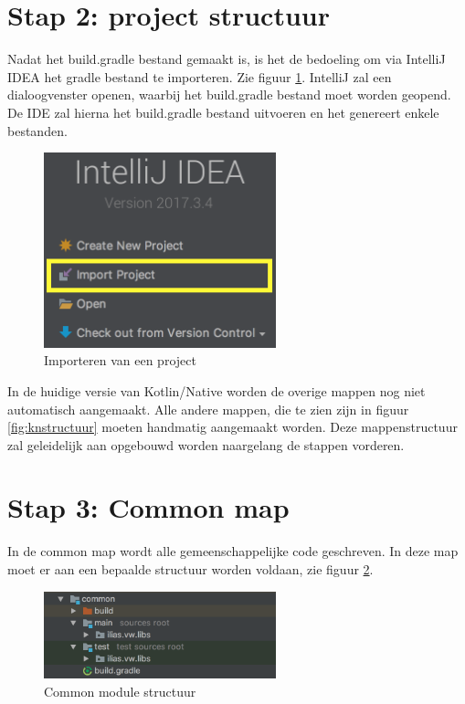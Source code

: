 \section{Stap 2: project structuur}
Nadat het build.gradle bestand gemaakt is, is het de bedoeling om via IntelliJ IDEA het gradle bestand te importeren. Zie figuur \ref{fig:stap2-import}. IntelliJ zal een dialoogvenster openen, waarbij het build.gradle bestand moet worden geopend. De IDE zal hierna het build.gradle bestand uitvoeren en het genereert enkele bestanden.

\begin{figure} [ht]
	\centering
	\includegraphics[width=0.60\textwidth]{img/stap2-import.png}
	\caption{Importeren van een project}
	\label{fig:stap2-import}
\end{figure}

In de huidige versie van Kotlin/Native worden de overige mappen nog niet automatisch aangemaakt. Alle andere mappen, die te zien zijn in figuur \ref{fig:knstructuur} moeten handmatig aangemaakt worden. Deze mappenstructuur zal geleidelijk aan opgebouwd worden naargelang de stappen vorderen.

\section{Stap 3: Common map }
In de common map wordt alle gemeenschappelijke code geschreven. In deze map moet er aan een bepaalde structuur worden voldaan, zie figuur \ref{fig:stap3-common}.

\begin{figure} [ht]
	\centering
	\includegraphics[width=0.60\textwidth]{img/stap3-common.png}
	\caption{Common module structuur}
	\label{fig:stap3-common}
\end{figure}

